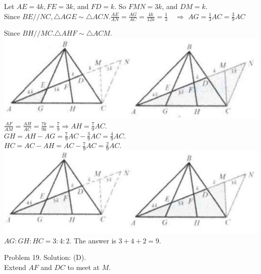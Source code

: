 \documentclass[10pt]{article}
\begin{document}
Let \(A E=4 k, F E=3 k\), and \(F D=k\). So \(F M N=3 k\), and \(D M=k\).\\
Since \(B E / / N C, \triangle A G E \sim \triangle A C N . \frac{A E}{A N}=\frac{A G}{A C}=\frac{4 k}{12 k}=\frac{1}{3} \quad \Rightarrow\) \(A G=\frac{1}{3} A C=\frac{3}{9} A C\)

Since \(B H / / M C . \triangle A H F \sim \triangle A C M\).\\
\includegraphics[max width=\textwidth, center]{2025_04_17_97bc1f7e44d93c271a88g-140(3)}\\
\(\frac{A F}{A M}=\frac{A H}{A C}=\frac{7 k}{9 k}=\frac{7}{9} \Rightarrow A H=\frac{7}{9} A C\).\\
\(G H=A H-A G=\frac{7}{9} A C-\frac{3}{9} A C=\frac{4}{9} A C\).\\
\(H C=A C-A H=A C-\frac{7}{9} A C=\frac{2}{9} A C\).\\
\includegraphics[max width=\textwidth, center]{2025_04_17_97bc1f7e44d93c271a88g-140}\\
\(A G: G H: H C=3: 4: 2\). The answer is \(3+4+2=9\).

Problem 19. Solution: (D).\\
Extend \(A F\) and \(D C\) to meet at \(M\).
\end{document}
